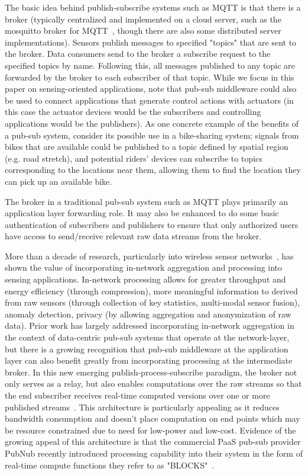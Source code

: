 The basic idea behind publish-subscribe systems such as MQTT is that there is a broker (typically centralized and implemented on a cloud server, such as the mosquitto broker for MQTT~\cite{light2013mosquitto}, though there are also some distributed server implementations). Sensors publish messages to specified "topics" that are sent to the broker. Data consumers send to the broker a subscribe request to the specified topics by name. Following this, all messages published to any topic are forwarded by the broker to each subscriber of that topic. While we focus in this paper on sensing-oriented applications, note that pub-sub middleware could also be used to connect applications that generate control actions with actuators (in this case the actuator devices would be the subscribers and controlling applications would be the publishers). As one concrete example of the benefits of a pub-sub system, consider its possible use in a bike-sharing system; signals from bikes that are available could be published to a topic defined by spatial region (e.g. road stretch), and potential riders' devices can subscribe to topics corresponding to the locations near them, allowing them to find the location they can pick up an available bike. 

The broker in a traditional pub-sub system such as MQTT plays primarily an application layer forwarding role. It may also be enhanced to do some basic authentication of subscribers and publishers to ensure that only authorized users have access to send/receive relevant raw data streams from the broker. 

More than a decade of research, particularly into  wireless sensor networks~\cite{yao2002cougar, krishnamachari2002impact}, has shown the value of incorporating in-network aggregation and processing into sensing applications.  In-network processing allows for greater throughput and energy efficiency (through compression), more meaningful information to derived from raw sensors (through collection of key statistics, multi-modal sensor fusion), anomaly detection, privacy (by allowing aggregation and anonymization of raw data). Prior work has largely addressed incorporating in-network aggregation in the context of data-centric pub-sub systems that operate at the network-layer, but there is a growing recognition that pub-sub middleware at the application layer can also benefit greatly from incorporating processing at the intermediate broker. In this new emerging  publish-process-subscribe paradigm, the broker not only serves as a relay, but also enables computations over the 
raw streams so that the end subscriber receives real-time computed versions over one or more published streams~\cite{kwame17}. This architecture is particularly appealing as it reduces bandwidth consumption and doesn't place computation on end points which may be resource constrained due to need for low-power and low-cost. Evidence of the growing appeal of this architecture is that the commercial PaaS pub-sub provider PubNub recently introduced processing capability into their system in the form of real-time compute functions they refer to as "BLOCKS"~\cite{blocks}.

